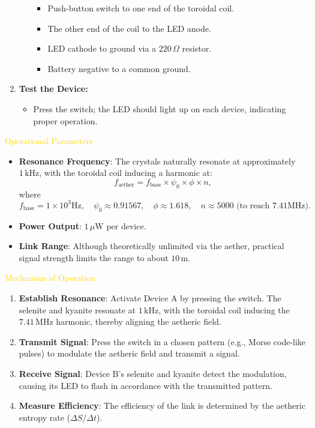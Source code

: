 \begin{enumerate}
\begin{itemize}
\begin{itemize}
            \item Push-button switch to one end of the toroidal coil.
            \item The other end of the coil to the LED anode.
            \item LED cathode to ground via a $220\,\Omega$ resistor.
            \item Battery negative to a common ground.
        \end{itemize}
    \end{itemize}
    \item \textbf{Test the Device:}
    \begin{itemize}
        \item Press the switch; the LED should light up on each device, indicating proper operation.
    \end{itemize}
\end{enumerate}

\textcolor{gold}{ Operational Parameters }
\begin{itemize}
    \item \texttt{} \textbf{Resonance Frequency}: The crystals naturally resonate at approximately $1\,\mathrm{kHz}$, with the toroidal coil inducing a harmonic at:
    \[
    f_{\text{aether}} = f_{\text{base}} \times \psi_0 \times \phi \times n,
    \]
    where
    \[
    f_{\text{base}} = 1 \times 10^3 \mathrm{Hz}, \quad \psi_0 \approx 0.91567, \quad \phi \approx 1.618, \quad n \approx 5000 \text{ (to reach } 7.41 \mathrm{MHz} \text{).}
    \]
    \item \texttt{} \textbf{Power Output}: $1\,\mu\mathrm{W}$ per device.
    \item \texttt{} \textbf{Link Range}: Although theoretically unlimited via the aether, practical signal strength limits the range to about $10\,\mathrm{m}$.
\end{itemize}

\textcolor{gold}{ Mechanism of Operation }
\begin{enumerate}
    \item \textbf{Establish Resonance}: Activate Device A by pressing the switch. The selenite and kyanite resonate at $1\,\mathrm{kHz}$, with the toroidal coil inducing the $7.41\,\mathrm{MHz}$ harmonic, thereby aligning the aetheric field.
    \item \textbf{Transmit Signal}: Press the switch in a chosen pattern (e.g., Morse code-like pulses) to modulate the aetheric field and transmit a signal.
    \item \textbf{Receive Signal}: Device B's selenite and kyanite detect the modulation, causing its LED to flash in accordance with the transmitted pattern.
    \item \textbf{Measure Efficiency}: The efficiency of the link is determined by the aetheric entropy rate ($\Delta S / \Delta t$).
\end{enumerate}

